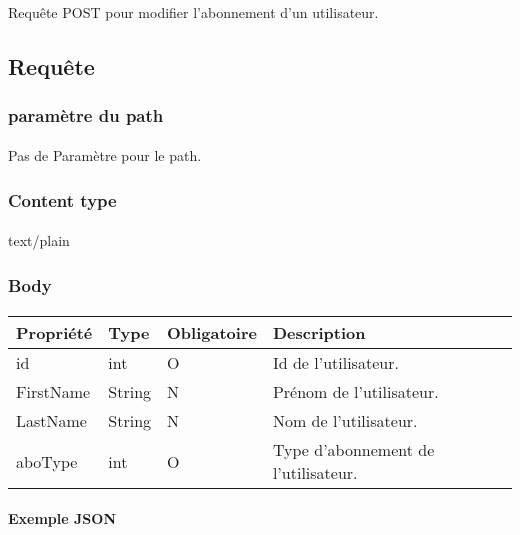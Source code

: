\paragraph{}
	Requête POST pour modifier l'abonnement d'un utilisateur.

\subsection{Requête}
	\subsubsection{paramètre du path}
		\paragraph{}
			Pas de Paramètre pour le path.
	
	\subsubsection{Content type}
		\paragraph{}
			text/plain
			
	\subsubsection{Body}
		\paragraph{}
			\begin{center}
				\begin{tabularx}{\textwidth}{| T{0.2122\textwidth} | S{0.22\textwidth} | S{0.15\textwidth} | S{0.3\textwidth} |}
					\hline
					Propriété & Type & Obligatoire & Description \\
					\hline
					id & int & O & Id de l'utilisateur. \\
					\hline
					FirstName & String & N & Prénom de l'utilisateur. \\
					\hline
					LastName & String & N & Nom de l'utilisateur. \\
					\hline
					aboType & int & O & Type d'abonnement de l'utilisateur. \\
					\hline
				\end{tabularx}
			\end{center}
			
		\paragraph{Exemple JSON}
